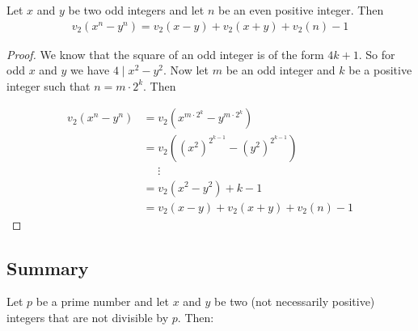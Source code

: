     \begin{theorem}
        Let $x$ and $y$ be two odd integers and let $n$ be an even positive integer. Then
        \begin{align*}
        v_2\left(  x^n - y^n \right) = v_2(  x - y )+v_2(  x + y )+v_2(  n )-1
        \end{align*}
    \end{theorem}

    \begin{proof}
        We know that the square of an odd integer is of the form $4k+1.$ So for odd $x$ and $y$ we have $4 \mid x^2-y^2.$ Now let $m$ be an odd integer and $k$ be a positive integer such that $n=m \cdot 2^k.$ Then

            \begin{align*}
                v_2 \left( x^{n} - y^{n} \right)  & = v_2\left( x^{m \cdot 2^{k}} - y^{m \cdot 2^{k}} \right)   \\
                & = v_2\left((x^2)^{2^{k-1}}-(y^2)^{2^{k-1}}\right) \\
                & \phantom{=} \vdots \\
                & =  v_2 \left( x^{2} - y^{2} \right) + k-1  \\
                & = v_2 ( x - y )+v_2 ( x + y )+v_2 ( n )-1
            \end{align*}
    \end{proof}

\subsection{Summary}

    Let $p$ be a prime number and let $x$ and $y$ be two (not necessarily positive) integers that are not divisible by $p.$ Then:

